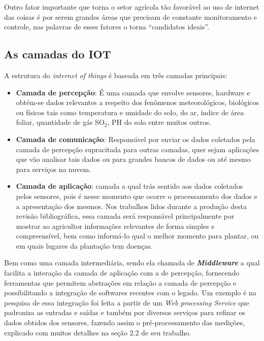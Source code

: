 \documentclass[
article,			%
12pt,				%
oneside,			%
a4paper,			%
english,			%
brazil,				%
sumario=tradicional
]{abntex2}
\begin{document}
Outro fator importante que torna o setor agrícola tão favorável ao uso de internet das coisas é por serem grandes áreas que precisam de constante monitoramento e controle, nas palavras de \citeauthor{10} esses fatores o torna ``candidatos ideais''.

\subsection{As camadas do IOT}\label{As camadas do IOT}

A estrutura do \textit{internet of things} é baseada em três camadas principais\cite{5}:
  \begin{itemize}
      \item \textbf{Camada de percepção}: É uma camada que envolve sensores, hardware e obtém-se dados relevantes a respeito dos fenômenos meteorológicos, biológicos ou físicos tais como  temperatura e umidade do solo\cite{3}, do ar\cite{9}, índice de área foliar\cite{8}, quantidade de gás SO$_{2}$\cite{13}, PH do solo\cite{13} entre muitos outros.
      \item \textbf{Camada de comunicação}: Responsável por enviar os dados coletados pela camada de percepção supracitada para outras camadas, quer sejam aplicações que vão analisar tais dados ou para grandes bancos de dados ou até mesmo para serviços na nuvem.
      \item \textbf{Camada de aplicação}: camada a qual trás sentido aos dados coletados pelos sensores, pois é nesse momento que ocorre o processamento dos dados e a apresentação dos mesmos. Nos trabalhos lidos durante a produção desta revisão bibliográfica, essa camada será responsável principalmente por mostrar ao agricultor informações relevantes de forma simples e compreensível, bem como informá-lo qual o melhor momento para plantar\cite{1}, ou em quais lugares da plantação tem doenças\cite{2}.
      \end{itemize}

		Bem como uma camada intermediária, sendo ela chamada de \textit{\bfseries Middleware} a qual facilita a interação da camada de aplicação com a de percepção\cite{5}, fornecendo ferramentas que permitem abstrações em relação a camada de percepção e possibilitando a integração de softwares recentes com o legado\cite{5}. Um exemplo é na pesquisa de \citeauthor{6} essa integração foi feita a partir de um \textit{Web processing Service} que padroniza as entradas e saídas e também por diversos serviços para refinar os dados obtidos dos sensores, fazendo assim o pré-processamento das medições, explicado com muitos detalhes na seção 2.2 de seu trabalho.
\end{document}

